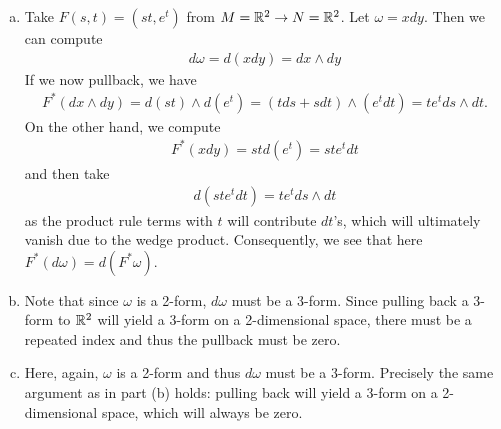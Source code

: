 \documentclass{../../mathnotes}
\begin{document}
\begin{enumerate}[(a)]
    \item Take $F(s,t)=(st,e^t)$ from $M=\mathbb{R}^2\to N=\mathbb{R}^2$. Let $\omega=x dy$. Then we can compute
        \begin{align*}
            d\omega=d(x dy)=dx\wedge dy
        \end{align*}
        If we now pullback, we have
        \begin{align*}
            F^*(dx\wedge dy)=d(st)\wedge d(e^t)=(t ds+s dt)\wedge(e^t dt)=te^t ds\wedge dt.
        \end{align*}
        On the other hand, we compute
        \begin{align*}
            F^*(x dy)=st d(e^t)=ste^t dt
        \end{align*}
        and then take
        \begin{align*}
            d(ste^t dt)=te^t ds\wedge dt
        \end{align*}
        as the product rule terms with $t$ will contribute $dt$'s, which will ultimately vanish due to the wedge product.
        Consequently, we see that here $F^*(d\omega)=d(F^*\omega)$.
    \item Note that since $\omega$ is a 2-form, $d\omega$ must be a 3-form. Since pulling back a 3-form to $\mathbb{R}^2$
        will yield a 3-form on a 2-dimensional space, there must be a repeated index and thus the pullback must be zero.
    \item Here, again, $\omega$ is a 2-form and thus $d\omega$ must be a 3-form. Precisely the same argument as in part (b) holds:
        pulling back will yield a 3-form on a 2-dimensional space, which will always be zero.
\end{enumerate}
\end{document}
